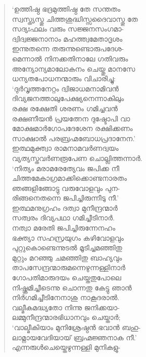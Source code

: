 \begin{verse}
‘ഉത്തിഷ്ഠ ഭദ്രമുത്തിഷ്ഠ തേ സന്തതം\\
സ്വസ്ത്യസ്തു ചിത്തശുദ്ധിസ്സദൈവാസ്തു തേ\\
സദ്യഃഫലം വരും സജ്ജനസംഗമാ-\\
ദ്വിദ്വജ്ജനാനാം മഹത്ത്വമേതാദൃശം\\
ഇന്നുതന്നെ തരുന്നുണ്ടൊരുപദേശ-\\
മെന്നാല്‍ നിനക്കതിനാലേ ഗതിവരും\\
അന്യോന്യമാലോകനം ചെയ്തു മാനസേ\\
ധന്യതപോധനന്മാരും വിചാരിച്ചു:\\
‘ദുര്‍വൃത്തനേറ്റം ദ്വിജാധമനാമിവന്‍\\
ദിവ്യജനത്താലുപേക്ഷ്യനെന്നാകിലും\\
രക്ഷ രക്ഷേതി ശരണം ഗമിച്ചവന്‍\\
രക്ഷണീയന്‍ പ്രയത്നേന ദുഷ്ടോപി വാ\\
മോക്ഷമാര്‍ഗോപദേശേന രക്ഷിക്കണം\\
സാക്ഷാല്‍ പരബ്രഹ്മബോധപ്രദാനേന.’\\
ഇത്ഥമുക്ത്വാ രാമനാമവര്‍ണദ്വയം\\
വ്യത്യസ്തവര്‍ണരൂപേണ ചൊല്ലിത്തന്നാര്‍.\\
‘നിത്യം മരാമരേത്യേവം ജപിക്ക നീ\\
ചിത്തമേകാഗ്രമാക്കിക്കൊണ്ടനാരതം\\
ഞങ്ങളിങ്ങോട്ടു വരുവോളവും പുന-\\
രിങ്ങനെതന്നെ ജപിച്ചിരുന്നീടു നീ.’\\
ഇത്ഥമനുഗ്രഹം ദത്വാ മുനീന്ദ്രന്മാര്‍\\
സത്വരം ദിവ്യപഥാ ഗമിച്ചീടിനാര്‍.\\
നത്വാ മരേതി ജപിച്ചിരുന്നേനഹം\\
ഭക്ത്യാ സഹസ്രയുഗം കഴിവോളവും\\
പുറ്റുകൊണ്ടെന്നുടല്‍ മൂടിച്ചമഞ്ഞിതു\\
മുറ്റും മറഞ്ഞു ചമഞ്ഞിതു ബാഹ്യവും\\
താപസേന്ദ്രന്മാരുമന്നെഴുന്നള്ളിനാര്‍\\
ഗോപതിമാരുദയം ചെയ്തതുപോലെ\\
നിഷ്ക്രമിച്ചീടെന്നു ചൊന്നതു കേട്ടു ഞാന്‍\\
നിര്‍ഗമിച്ചീടിനേനാശു നാകൂദരാല്‍.\\
വല്മീകമദ്ധ്യതോ നിന്നു ജനിക്കയാ-\\
ലമ്മുനീന്ദ്രന്മാരഭിധാനവും ചെയ്താര്‍;\\
‘വാല്മീകിയാം മുനിശ്രേഷ്ഠന്‍ ഭവാന്‍ ബഹു-\\
ലാമ്നായവേദിയായ് ബ്രഹ്മജ്ഞനാക നീ.’\\
എന്നരുള്‍ചെയ്തെഴുന്നള്ളി മുനികളു-\\

\end{verse}
